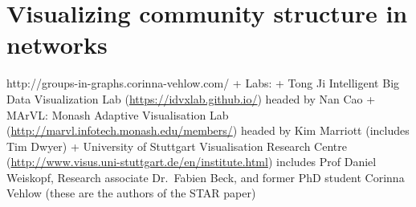 \hypertarget{visualization}{\section{Visualizing community structure in
networks}\label{visualization}}

\protect\hyperlink{visualization}{}

http://groups-in-graphs.corinna-vehlow.com/ + Labs: + Tong Ji
Intelligent Big Data Visualization Lab
(\url{https://idvxlab.github.io/}) headed by Nan Cao + MArVL: Monash
Adaptive Visualisation Lab
(\url{http://marvl.infotech.monash.edu/members/}) headed by Kim Marriott
(includes Tim Dwyer) + University of Stuttgart Visualisation Research
Centre (\url{http://www.visus.uni-stuttgart.de/en/institute.html})
includes Prof Daniel Weiskopf, Research associate Dr.~Fabien Beck, and
former PhD student Corinna Vehlow (these are the authors of the STAR
paper)

